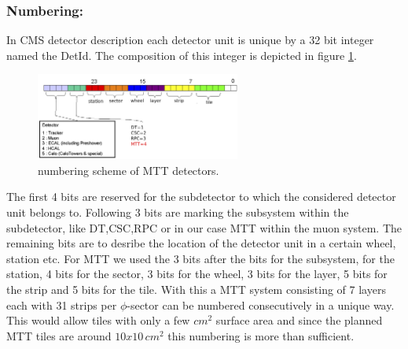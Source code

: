 			\subsubsection*{Numbering:}
			In CMS detector description each detector unit is unique by a 32 bit integer named the DetId.
			The composition of this integer is depicted in figure \ref{fig:numbering}.
			\begin{figure}[htbp]
				\centering
				\includegraphics[width=0.6\textwidth]{Figures/erdogan/numbering.png}
				\caption{numbering scheme of MTT detectors.}
				\label{fig:numbering}
			\end{figure}
			The first 4 bits are reserved for the subdetector to which the considered detector unit belongs to.
			Following 3 bits are marking the subsystem within the subdetector, like DT,CSC,RPC or in our case MTT within the muon system.
			The remaining bits are to desribe the location of the detector unit in a certain wheel, station etc.
			For MTT we used the 3 bits after the bits for the subsystem, for the station, 4 bits for the sector, 3 bits for the wheel, 3 bits for the layer, 5 bits for the strip and 5 bits for the tile.
			With this a MTT system consisting of 7 layers each with 31 strips per $\phi$-sector can be numbered consecutively in a unique way.
			This would allow tiles with only a few $cm^2$ surface area and since the planned MTT tiles are around $10x10\,cm^2$ this numbering is more than sufficient.
